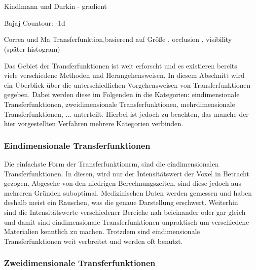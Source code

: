 \chapter{}
\label{sec:state_of_the_art}



Kindlmann und Durkin  \cite{kindlmann1998semi} - gradient


Bajaj Countour: \cite{bajaj1997contour} -1d


Correa und Ma Transferfunktion,basierend auf Größe \cite{correa2008size}, occlusion \cite{correa2009occlusion}, visibility \cite{correa2009visibility}(später histogram\cite{correa2011visibility})

 






Das Gebiet der Transferfunktionen ist weit erforscht und es existieren bereits viele verschiedene Methoden und Herangehensweisen. In diesem Abschnitt wird ein Überblick über die unterschiedlichen Vorgehensweisen von Transferfunktionen gegeben. Dabei werden diese im Folgenden in die Kategorien: eindimensionale Transferfunktionen, zweidimensionale Transferfunktionen, mehrdimensionale Transferfunktionen, ... unterteilt. Hierbei ist jedoch zu beachten, das manche der hier vorgestellten Verfahren mehrere Kategorien verbinden.


\subsection{Eindimensionale Transferfunktionen}

Die einfachste Form der Transferfunktionrm, sind die eindimensionalen Transferfunktionen. In diesen, wird nur der Intensitätswert der Voxel in Betracht gezogen. Abgesehe von den niedrigen Berechnungszeiten, sind diese jedoch aus mehreren Gründen suboptimal. Medizinischen Daten werden gemessen und haben deshalb meist ein Rauschen, was die genaue Darstellung erschwert. Weiterhin sind die Intensitätswerte verschiedener Bereiche nah beieinander oder gar gleich und damit sind eindimensionale Transferfunktionen unpraktisch um verschiedene Materialien kenntlich zu machen. Trotzdem sind eindimensionale Transferfunktionen weit verbreitet und werden oft benutzt. 
\newline




\subsection{Zweidimensionale Transferfunktionen}

